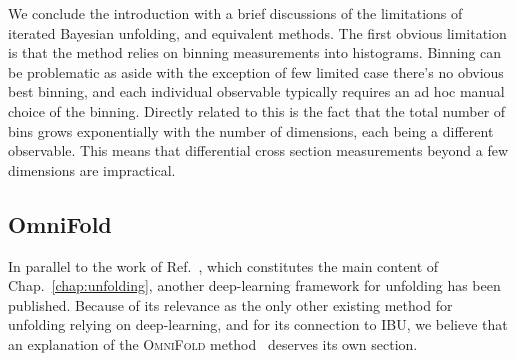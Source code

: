 We conclude the introduction with a brief discussions of the limitations of iterated Bayesian unfolding, and equivalent methods. The first obvious limitation is that the method relies on binning measurements into histograms. Binning can be problematic as aside with the exception of few limited case there's no obvious best binning, and each individual observable typically requires an ad hoc manual choice of the binning. Directly related to this is the fact that the total number of bins grows exponentially with the number of dimensions, each being a different observable. This means that differential cross section measurements beyond a few dimensions are impractical.

\subsection{OmniFold}

In parallel to the work of Ref.~\cite{cond_gan, Bellagente:2020piv}, which constitutes the main content of Chap.~\ref{chap:unfolding}, another deep-learning framework for unfolding has been published. Because of its relevance as the only other existing method for unfolding relying on deep-learning, and for its connection to IBU, we believe that an explanation of the \textsc{OmniFold} method~\cite{Andreassen:2019cjw} deserves its own section.

